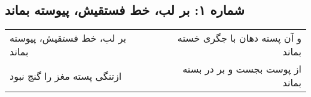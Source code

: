\begin{center}
\section*{شماره ۱: بر لب، خط فستقیش، پیوسته بماند}
\label{sec:001}
\begin{longtable}{l p{0.5cm} r}
بر لب، خط فستقیش، پیوسته بماند
&&
و آن پسته دهان با جگری خسته بماند
\\
ازتنگی پسته مغز را گنج نبود
&&
از پوست بجست و بر در بسته بماند
\\
\end{longtable}
\end{center}
